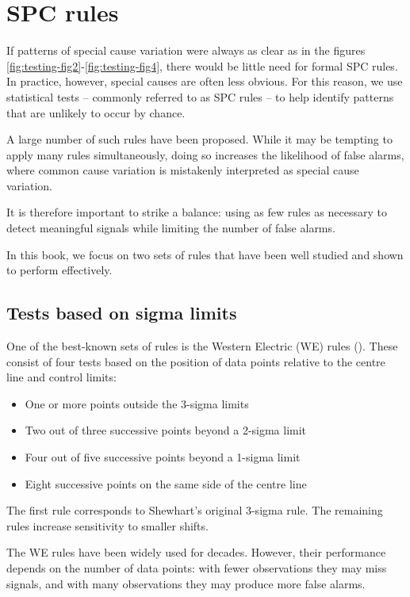 \documentclass[
]{book}
\providecommand{\tightlist}{%
  \setlength{\itemsep}{0pt}\setlength{\parskip}{0pt}}
\begin{document}
\section{SPC rules}\label{spc-rules}

If patterns of special cause variation were always as clear as in the figures \ref{fig:testing-fig2}-\ref{fig:testing-fig4}, there would be little need for formal SPC rules. In practice, however, special causes are often less obvious. For this reason, we use statistical tests -- commonly referred to as SPC rules -- to help identify patterns that are unlikely to occur by chance.

A large number of such rules have been proposed. While it may be tempting to apply many rules simultaneously, doing so increases the likelihood of false alarms, where common cause variation is mistakenly interpreted as special cause variation.

It is therefore important to strike a balance: using as few rules as necessary to detect meaningful signals while limiting the number of false alarms.

In this book, we focus on two sets of rules that have been well studied and shown to perform effectively.

\subsection{Tests based on sigma limits}\label{tests-based-on-sigma-limits}

One of the best-known sets of rules is the Western Electric (WE) rules (). These consist of four tests based on the position of data points relative to the centre line and control limits:

\begin{itemize}
\tightlist
\item
  One or more points outside the 3-sigma limits
\item
  Two out of three successive points beyond a 2-sigma limit
\item
  Four out of five successive points beyond a 1-sigma limit
\item
  Eight successive points on the same side of the centre line
\end{itemize}

The first rule corresponds to Shewhart's original 3-sigma rule. The remaining rules increase sensitivity to smaller shifts.

The WE rules have been widely used for decades. However, their performance depends on the number of data points: with fewer observations they may miss signals, and with many observations they may produce more false alarms.
\end{document}

